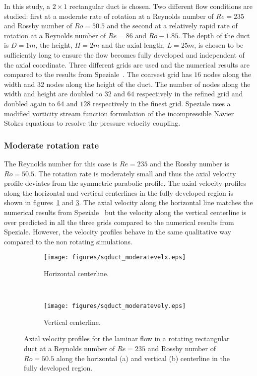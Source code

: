 In this study, a $2\times1$ rectangular duct is chosen. Two different flow conditions are studied: first at a moderate rate of rotation at a Reynolds number of $Re=235$ and Rossby number of $Ro=50.5$ and the second at a relatively rapid rate of rotation at a Reynolds number of $Re=86$ and $Ro-1.85$. The depth of the duct is $D=1m$, the height, $H=2m$ and the axial length, $L=25m$, is chosen to be sufficiently long to ensure the flow becomes fully developed and independent of the axial coordinate. Three different grids are used and the numerical results are compared to the results from Speziale~\cite{Speziale1982}. The coarsest grid has $16$ nodes along the width and $32$ nodes along the height of the duct. The number of nodes along the width and height are doubled to $32$ and $64$ respectively in the refined grid and doubled again to $64$ and $128$ respectively in the finest grid. Speziale uses a modified vorticity stream function formulation of the incompressible Navier Stokes equations to resolve the pressure velocity coupling.

\subsubsection{Moderate rotation rate}
The Reynolds number for this case is $Re=235$ and the Rossby number is $Ro = 50.5$. The rotation rate is moderately small and thus the axial velocity profile deviates from the symmetric parabolic profile. The axial velocity profiles along the horizontal and vertical centerlines in the fully developed region is shown in figures~\ref{fig:sqductmodx} and \ref{fig:sqductmody}. The axial velocity along the horizontal line matches the numerical results from Speziale~\cite{Speziale1982} but the velocity along the vertical centerline is over predicted in all the three grids compared to the numerical results from Speziale. However, the velocity profiles behave in the same qualitative way compared to the non rotating simulations.
\begin{figure}[h!]
    \centering
    \captionsetup{justification=centering}
    \begin{subfigure}[b]{0.48\textwidth}
    \captionsetup{justification=centering}
        \texttt{[image: figures/sqduct\_moderatevelx.eps]}    
    \caption{Horizontal centerline.}
    \label{fig:sqductmodx}
    \end{subfigure}
    ~ %
    \begin{subfigure}[b]{0.48\textwidth}
    \centering
    \captionsetup{justification=centering}
        \texttt{[image: figures/sqduct\_moderatevely.eps]}
        \caption{Vertical centerline.}
    \label{fig:sqductmody}
    \end{subfigure}
    \caption{Axial velocity profiles for the laminar flow in a rotating rectangular duct at a Reynolds number of $Re=235$ and Rossby number of $Ro=50.5$ along the horizontal (a) and vertical (b) centerline in the fully developed region.}
\end{figure}

